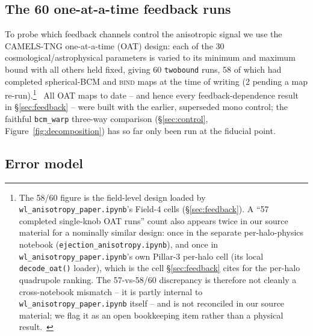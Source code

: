 \documentclass[11pt]{article}
\newcommand{\bind}{\textsc{bind}}
\begin{document}
\subsection{The 60 one-at-a-time feedback runs}\label{sec:oat}

To probe which feedback channels control the anisotropic signal we use
the CAMELS-TNG one-at-a-time (OAT) design: each of the 30
cosmological/astrophysical parameters is varied to its minimum and
maximum bound with all others held fixed, giving 60 \texttt{twobound}
runs, 58 of which had completed spherical-BCM and \bind{} maps at the
time of writing (2 pending a map re-run).\footnote{The 58/60 figure is
the field-level design loaded by \texttt{wl\_anisotropy\_paper.ipynb}'s
Field-4 cells (\S\ref{sec:feedback}). A ``57 completed single-knob OAT
runs'' count also appears twice in our source material for a nominally
similar design: once in the separate per-halo-physics notebook
(\texttt{ejection\_anisotropy.ipynb}), and once in
\texttt{wl\_anisotropy\_paper.ipynb}'s own Pillar-3 per-halo cell (its
local \texttt{decode\_oat()} loader), which is the cell
\S\ref{sec:feedback} cites for the per-halo quadrupole ranking. The
57-vs-58/60 discrepancy is therefore not cleanly a cross-notebook
mismatch -- it is partly internal to \texttt{wl\_anisotropy\_paper.ipynb}
itself -- and is not reconciled in our source material; we flag it as an
open bookkeeping item rather than a physical result.\ %
}\ %
All OAT maps to date -- and hence every feedback-dependence result in
\S\ref{sec:feedback} -- were built with the earlier, superseded mono
control; the faithful \texttt{bcm\_warp} three-way comparison
(\S\ref{sec:control}, Figure~\ref{fig:decomposition}) has so far only
been run at the fiducial point.\ %

\subsection{Error model}\label{sec:errors}
\end{document}
